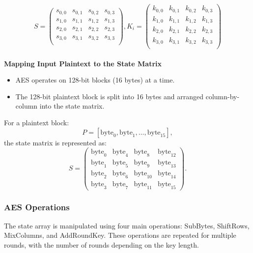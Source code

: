 \[ S = \begin{pmatrix}
    s_{0,0} & s_{0,1} & s_{0,2} & s_{0,3} \\
    s_{1,0} & s_{1,1} & s_{1,2} & s_{1,3} \\
    s_{2,0} & s_{2,1} & s_{2,2} & s_{2,3} \\
    s_{3,0} & s_{3,1} & s_{3,2} & s_{3,3} \\
\end{pmatrix},
K_i = \begin{pmatrix}
    k_{0,0} & k_{0,1} & k_{0,2} & k_{0,3} \\
    k_{1,0} & k_{1,1} & k_{1,2} & k_{1,3} \\
    k_{2,0} & k_{2,1} & k_{2,2} & k_{2,3} \\
    k_{3,0} & k_{3,1} & k_{3,2} & k_{3,3} \\
\end{pmatrix} \] \\

\textbf{Mapping Input Plaintext to the State Matrix}
\begin{itemize}
    \item AES operates on 128-bit blocks (16 bytes) at a time.
    \item The 128-bit plaintext block is split into 16 bytes and arranged column-by-column into the state matrix.
\end{itemize}

For a plaintext block:
\[
P = [\text{byte}_0, \text{byte}_1, \dots, \text{byte}_{15}],
\]
the state matrix is represented as:
\[
S = 
\begin{pmatrix}
\text{byte}_0 & \text{byte}_4 & \text{byte}_8  & \text{byte}_{12} \\
\text{byte}_1 & \text{byte}_5 & \text{byte}_9  & \text{byte}_{13} \\
\text{byte}_2 & \text{byte}_6 & \text{byte}_{10} & \text{byte}_{14} \\
\text{byte}_3 & \text{byte}_7 & \text{byte}_{11} & \text{byte}_{15}
\end{pmatrix}.
\]

\subsubsection{AES Operations}
The state array is manipulated using four main operations: SubBytes, ShiftRows, MixColumns, and AddRoundKey. These operations are repeated for multiple rounds, with the number of rounds depending on the key length. \\


